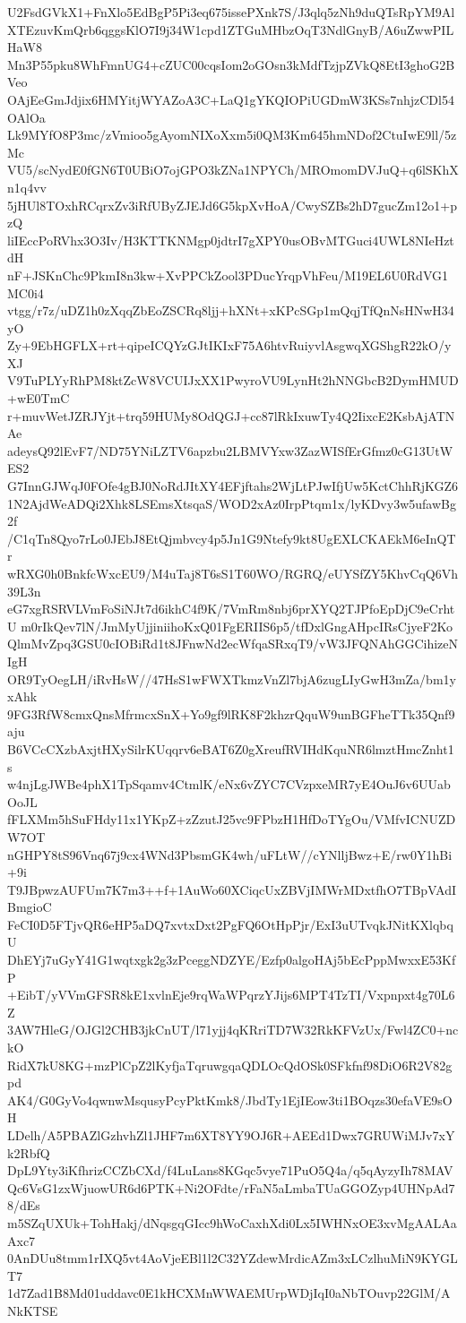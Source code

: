U2FsdGVkX1+FnXlo5EdBgP5Pi3eq675issePXnk7S/J3qlq5zNh9duQTsRpYM9Al
XTEzuvKmQrb6qggsKlO7I9j34W1cpd1ZTGuMHbzOqT3NdlGnyB/A6uZwwPILHaW8
Mn3P55pku8WhFmnUG4+cZUC00cqsIom2oGOsn3kMdfTzjpZVkQ8EtI3ghoG2BVeo
OAjEeGmJdjix6HMYitjWYAZoA3C+LaQ1gYKQIOPiUGDmW3KSs7nhjzCDl54OAlOa
Lk9MYfO8P3mc/zVmioo5gAyomNIXoXxm5i0QM3Km645hmNDof2CtuIwE9ll/5zMc
VU5/scNydE0fGN6T0UBiO7ojGPO3kZNa1NPYCh/MROmomDVJuQ+q6lSKhXn1q4vv
5jHUl8TOxhRCqrxZv3iRfUByZJEJd6G5kpXvHoA/CwySZBs2hD7gucZm12o1+pzQ
liIEccPoRVhx3O3Iv/H3KTTKNMgp0jdtrI7gXPY0usOBvMTGuci4UWL8NIeHztdH
nF+JSKnChc9PkmI8n3kw+XvPPCkZool3PDucYrqpVhFeu/M19EL6U0RdVG1MC0i4
vtgg/r7z/uDZ1h0zXqqZbEoZSCRq8ljj+hXNt+xKPcSGp1mQqjTfQnNsHNwH34yO
Zy+9EbHGFLX+rt+qipeICQYzGJtIKIxF75A6htvRuiyvlAsgwqXGShgR22kO/yXJ
V9TuPLYyRhPM8ktZcW8VCUIJxXX1PwyroVU9LynHt2hNNGbcB2DymHMUD+wE0TmC
r+muvWetJZRJYjt+trq59HUMy8OdQGJ+cc87lRkIxuwTy4Q2IixcE2KsbAjATNAe
adeysQ92lEvF7/ND75YNiLZTV6apzbu2LBMVYxw3ZazWISfErGfmz0cG13UtWES2
G7InnGJWqJ0FOfe4gBJ0NoRdJItXY4EFjftahs2WjLtPJwIfjUw5KctChhRjKGZ6
1N2AjdWeADQi2Xhk8LSEmsXtsqaS/WOD2xAz0IrpPtqm1x/lyKDvy3w5ufawBg2f
/C1qTn8Qyo7rLo0JEbJ8EtQjmbvcy4p5Jn1G9Ntefy9kt8UgEXLCKAEkM6eInQTr
wRXG0h0BnkfcWxcEU9/M4uTaj8T6sS1T60WO/RGRQ/eUYSfZY5KhvCqQ6Vh39L3n
eG7xgRSRVLVmFoSiNJt7d6ikhC4f9K/7VmRm8nbj6prXYQ2TJPfoEpDjC9eCrhtU
m0rIkQev7lN/JmMyUjjiniihoKxQ01FgERIIS6p5/tfDxlGngAHpcIRsCjyeF2Ko
QlmMvZpq3GSU0cIOBiRd1t8JFnwNd2ecWfqaSRxqT9/vW3JFQNAhGGCihizeNIgH
OR9TyOegLH/iRvHsW//47HsS1wFWXTkmzVnZl7bjA6zugLIyGwH3mZa/bm1yxAhk
9FG3RfW8cmxQnsMfrmcxSnX+Yo9gf9lRK8F2khzrQquW9unBGFheTTk35Qnf9aju
B6VCcCXzbAxjtHXySilrKUqqrv6eBAT6Z0gXreufRVIHdKquNR6lmztHmcZnht1s
w4njLgJWBe4phX1TpSqamv4CtmlK/eNx6vZYC7CVzpxeMR7yE4OuJ6v6UUabOoJL
fFLXMm5hSuFHdy11x1YKpZ+zZzutJ25vc9FPbzH1HfDoTYgOu/VMfvICNUZDW7OT
nGHPY8tS96Vnq67j9cx4WNd3PbsmGK4wh/uFLtW//cYNlljBwz+E/rw0Y1hBi+9i
T9JBpwzAUFUm7K7m3++f+1AuWo60XCiqcUxZBVjIMWrMDxtfhO7TBpVAdIBmgioC
FeCI0D5FTjvQR6eHP5aDQ7xvtxDxt2PgFQ6OtHpPjr/ExI3uUTvqkJNitKXlqbqU
DhEYj7uGyY41G1wqtxgk2g3zPceggNDZYE/Ezfp0algoHAj5bEcPppMwxxE53KfP
+EibT/yVVmGFSR8kE1xvlnEje9rqWaWPqrzYJijs6MPT4TzTI/Vxpnpxt4g70L6Z
3AW7HleG/OJGl2CHB3jkCnUT/l71yjj4qKRriTD7W32RkKFVzUx/Fwl4ZC0+nckO
RidX7kU8KG+mzPlCpZ2lKyfjaTqruwgqaQDLOcQdOSk0SFkfnf98DiO6R2V82gpd
AK4/G0GyVo4qwnwMsqusyPcyPktKmk8/JbdTy1EjIEow3ti1BOqzs30efaVE9sOH
LDelh/A5PBAZlGzhvhZl1JHF7m6XT8YY9OJ6R+AEEd1Dwx7GRUWiMJv7xYk2RbfQ
DpL9Yty3iKfhrizCCZbCXd/f4LuLans8KGqc5vye71PuO5Q4a/q5qAyzyIh78MAV
Qc6VsG1zxWjuowUR6d6PTK+Ni2OFdte/rFaN5aLmbaTUaGGOZyp4UHNpAd78/dEs
m5SZqUXUk+TohHakj/dNqsgqGIcc9hWoCaxhXdi0Lx5IWHNxOE3xvMgAALAaAxc7
0AnDUu8tmm1rIXQ5vt4AoVjeEBl1l2C32YZdewMrdicAZm3xLCzlhuMiN9KYGLT7
1d7Zad1B8Md01uddavc0E1kHCXMnWWAEMUrpWDjIqI0aNbTOuvp22GlM/ANkKTSE
